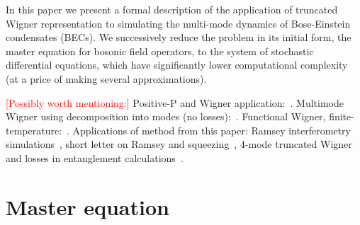 \documentclass[12pt,aip,jmp,amssymb,amsmath]{revtex4-1}
\newcommand{\todo}[1]{\textcolor{red}{[#1]}}
\begin{document}
In this paper we present a formal description of the application of truncated Wigner representation to simulating the multi-mode dynamics of Bose-Einstein condensates (BECs).
We successively reduce the problem in its initial form, the master equation for bosonic field operators, to the system of stochastic differential equations, which have significantly lower computational complexity (at a price of making several approximations).

\todo{Possibly worth mentioning:}
Positive-P and Wigner application:~\cite{Deuar2007}.
Multimode Wigner using decomposition into modes (no losses):~\cite{Norrie2005,Norrie2006}.
Functional Wigner, finite-temperature:~\cite{Steel1998,Isella2006}.
Applications of method from this paper: Ramsey interferometry simulations~\cite{Egorov2011}, short letter on Ramsey and squeezing~\cite{Opanchuk2012}, 4-mode truncated Wigner and losses in entanglement calculations~\cite{Opanchuk2012a}.



\section{Master equation}
\end{document}
